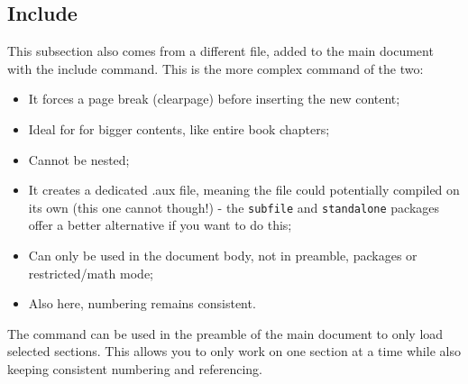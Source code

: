 \subsection{Include}
This subsection also comes from a different file, added to the main document 
with the include command. This is the more complex command of the two: 

\begin{itemize}
	\item It forces a page break (clearpage) before inserting the new content;
	\item Ideal for for bigger contents, like entire book chapters;
	\item Cannot be nested;
	\item It creates a dedicated .aux file, meaning the file could potentially 
	compiled on its own (this one cannot though!) - the \texttt{subfile} and 
	\texttt{standalone} packages offer a better alternative if you want to do 
	this; %
	\item Can only be used in the document body, not in preamble, packages or 
	restricted/math mode;
	\item Also here, numbering remains consistent.
\end{itemize}

The command \verb++ can be used in the 
preamble of the main document to only load selected sections. This allows you 
to only work on one section at a time while also keeping consistent numbering 
and referencing.